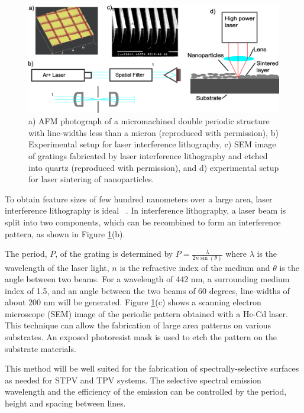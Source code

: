 \documentclass[review]{elsarticle}
\begin{document}
\begin{figure}[ht!]
	\includegraphics[width=\textwidth]{gfig12_comb}
	\caption{\label{gfig12_comb} a) AFM photograph of a micromachined double periodic structure with line-widths less than a micron \cite{g29} (reproduced with permission), b) Experimental setup for laser interference lithography, c) SEM image of gratings fabricated by laser interference lithography and etched into quartz \cite{g30} (reproduced with permission), and d) experimental setup for laser sintering of nanoparticles.} %
\end{figure}

To obtain feature sizes of few hundred nanometers over a large area, laser interference lithography is ideal ~\cite{g30}. In interference lithography, a laser beam is split into two components, which can be recombined to form an interference pattern,  as shown in Figure \ref{gfig12_comb}(b). 

The period, $P$,  of the grating is determined by $P =\frac{\lambda}{2n\sin(\theta)}$ where  $\lambda$ is the wavelength of the laser light, $n$ is the refractive index of the medium and $\theta$ is the angle between two beams. For a wavelength of 442 nm, a surrounding medium index of 1.5, and an angle between the two beams of 60 degrees, line-widths of about 200 nm will be generated.  
Figure \ref{gfig12_comb}(c) shows a scanning electron microscope (SEM) image of the periodic pattern obtained with a He-Cd laser. This technique can allow the fabrication of large area patterns on various substrates. An exposed photoresist mask is used to etch the pattern on the substrate materials. 

This method will be well suited for the fabrication of spectrally-selective surfaces as 
needed for STPV and TPV systems.  The selective spectral emission wavelength and the 
efficiency of the emission can be controlled by the period, height and spacing between lines.
\end{document}
